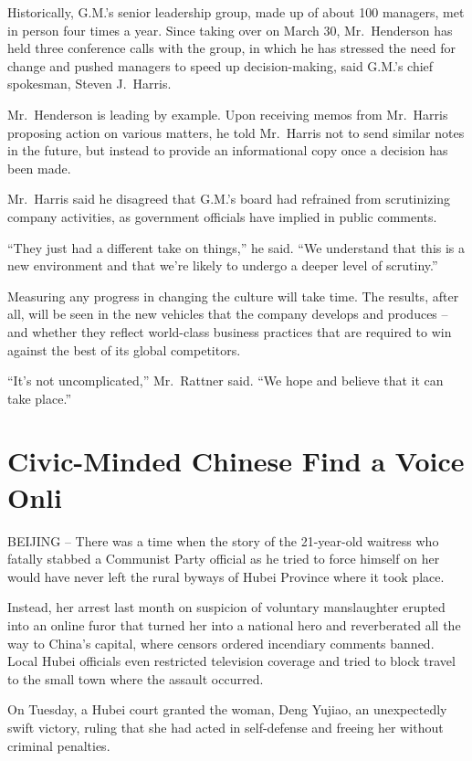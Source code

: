 ﻿\documentclass[12pt,a4paper,onecolumn]{article}
\begin{document}
Historically, G.M.'s senior leadership group, made up of about 100 managers, met in person four
times a year. Since taking over on March 30, Mr.~Henderson has held three conference calls with the
group, in which he has stressed the need for change and pushed managers to speed up decision-making,
said G.M.'s chief spokesman, Steven J.~Harris.

Mr.~Henderson is leading by example. Upon receiving memos from Mr.~Harris proposing action on
various matters, he told Mr.~Harris not to send similar notes in the future, but instead to provide
an informational copy once a decision has been made.

Mr.~Harris said he disagreed that G.M.'s board had refrained from scrutinizing company activities,
as government officials have implied in public comments.

``They just had a different take on things,'' he said. ``We understand that this is a new
environment and that we're likely to undergo a deeper level of scrutiny.''

Measuring any progress in changing the culture will take time. The results, after all, will be seen
in the new vehicles that the company develops and produces -- and whether they reflect world-class
business practices that are required to win against the best of its global competitors.

``It's not uncomplicated,'' Mr.~Rattner said. ``We hope and believe that it can take place.''


\section{Civic-Minded Chinese Find a Voice Onli}

BEIJING -- There was a time when the story of the 21-year-old waitress who fatally stabbed a
Communist Party official as he tried to force himself on her would have never left the rural byways
of Hubei Province where it took place.

Instead, her arrest last month on suspicion of voluntary manslaughter erupted into an online furor
that turned her into a national hero and reverberated all the way to China's capital, where censors
ordered incendiary comments banned. Local Hubei officials even restricted television coverage and
tried to block travel to the small town where the assault occurred.

On Tuesday, a Hubei court granted the woman, Deng Yujiao, an unexpectedly swift victory, ruling that
she had acted in self-defense and freeing her without criminal penalties.
\end{document}
